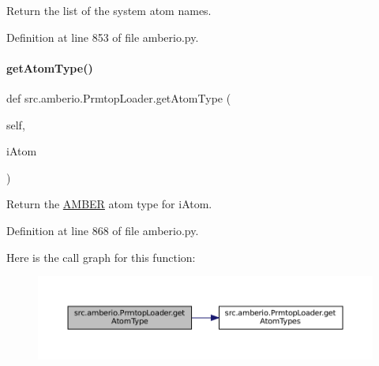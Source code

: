 Return the list of the system atom names. 



Definition at line 853 of file amberio.\+py.

\mbox{\label{classsrc_1_1amberio_1_1PrmtopLoader_ab3640ff8568112edfc9d4b135e405ce7}} 
\paragraph{\texorpdfstring{get\+Atom\+Type()}{getAtomType()}}
{\footnotesize\ttfamily def src.\+amberio.\+Prmtop\+Loader.\+get\+Atom\+Type (\begin{DoxyParamCaption}\item[{}]{self,  }\item[{}]{i\+Atom }\end{DoxyParamCaption})}



Return the \hyperlink{classsrc_1_1amberio_1_1AMBER}{A\+M\+B\+ER} atom type for i\+Atom. 



Definition at line 868 of file amberio.\+py.

Here is the call graph for this function\+:
\nopagebreak
\begin{figure}[H]
\begin{center}
\leavevmode
\includegraphics[width=350pt]{classsrc_1_1amberio_1_1PrmtopLoader_ab3640ff8568112edfc9d4b135e405ce7_cgraph}
\end{center}
\end{figure}
\mbox{\label{classsrc_1_1amberio_1_1PrmtopLoader_a584354ca99dcfbd2de370e97cf121a6c}} 
